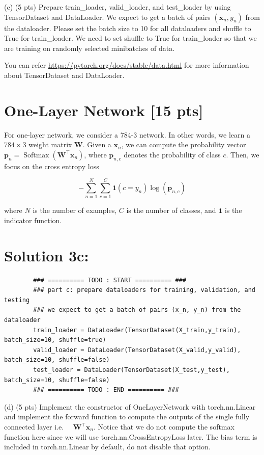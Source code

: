 \documentclass[10pt]{article}
\begin{document}
(c) (5 pts) Prepare train\_loader, valid\_loader, and test\_loader by using TensorDataset and DataLoader. We expect to get a batch of pairs $\left(\mathbf{x}_{n}, y_{n}\right)$ from the dataloader. Please set the batch size to 10 for all dataloaders and shuffle to True for train\_loader. We need to set shuffle to True for train\_loader so that we are training on randomly selected minibatches of data.

You can refer \href{https://pytorch.org/docs/stable/data.html}{https://pytorch.org/docs/stable/data.html} for more information about TensorDataset and DataLoader.

\section*{One-Layer Network [15 pts]}
For one-layer network, we consider a 784-3 network. In other words, we learn a $784 \times 3$ weight matrix $\mathbf{W}$. Given a $\mathbf{x}_{n}$, we can compute the probability vector $\mathbf{p}_{n}=\operatorname{Softmax}\left(\mathbf{W}^{\top} \mathbf{x}_{n}\right)$, where $\mathbf{p}_{n, c}$ denotes the probability of class $c$. Then, we focus on the cross entropy loss

$$
-\sum_{n=1}^{N} \sum_{c=1}^{C} \mathbf{1}\left(c=y_{n}\right) \log \left(\mathbf{p}_{n, c}\right)
$$

where $N$ is the number of examples, $C$ is the number of classes, and $\mathbf{1}$ is the indicator function.

\section*{Solution 3c:}

\begin{verbatim}
        ### ========== TODO : START ========== ###
        ### part c: prepare dataloaders for training, validation, and testing
        ### we expect to get a batch of pairs (x_n, y_n) from the dataloader
        train_loader = DataLoader(TensorDataset(X_train,y_train), batch_size=10, shuffle=true)
        valid_loader = DataLoader(TensorDataset(X_valid,y_valid), batch_size=10, shuffle=false)
        test_loader = DataLoader(TensorDataset(X_test,y_test), batch_size=10, shuffle=false)
        ### ========== TODO : END ========== ###
\end{verbatim}

(d) (5 pts) Implement the constructor of OneLayerNetwork with torch.nn.Linear and implement the forward function to compute the outputs of the single fully connected layer i.e. $\quad \mathbf{W}^{\top} \mathbf{x}_{n}$. Notice that we do not compute the softmax function here since we will use torch.nn.CrossEntropyLoss later. The bias term is included in torch.nn.Linear by default, do not disable that option.
\end{document}
